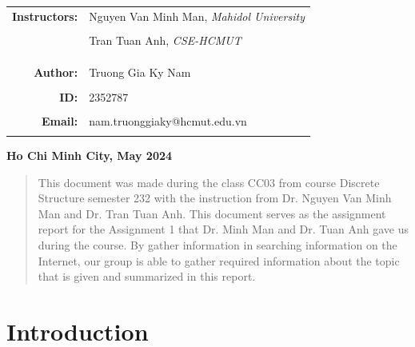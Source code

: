 \documentclass[a4paper]{article}
\begin{document}
\begin{titlepage}
\begin{center}
\begin{tabular}{ccc}
    \multicolumn{1}{r}{\textbf{\Large Instructors:}} & \multicolumn{2}{l}{\Large Nguyen Van Minh Man, \textit{Mahidol University}} \\ \\
    \multicolumn{1}{r}{} & \multicolumn{2}{l}{\Large Tran Tuan Anh, \textit{CSE-HCMUT}} \\ \\

    \\ \\

    \multicolumn{1}{r}{\Large \textbf{Author:}} & \multicolumn{2}{l}{\Large Truong Gia Ky Nam} \\ \\

    \multicolumn{1}{r}{\Large \textbf{ID:}} & \multicolumn{2}{l}{\Large 2352787} \\ \\

    \multicolumn{1}{r}{\Large \textbf{Email:}} & \multicolumn{2}{l}{\Large nam.truonggiaky@hcmut.edu.vn} \\ \\
\end{tabular}
\end{center}

\vspace{4cm}

\begin{center}
{\textbf{\Large Ho Chi Minh City, May 2024}}
\end{center}
\end{titlepage}

\thispagestyle{empty}
\setcounter{page}{-1}
\newpage
\tableofcontents
\newpage

\thispagestyle{empty}
\newpage
\begin{abstract}
\noindent This document was made during the class CC03 from course Discrete Structure semester 232 with the instruction from Dr. Nguyen Van Minh Man and Dr. Tran Tuan Anh. This document serves as the assignment report for the Assignment 1 that Dr. Minh Man and Dr. Tuan Anh gave us during the course. By gather information in searching information on the Internet, our group is able to gather required information about the topic that is given and summarized in this report.
\end{abstract}
\newpage

\section{Introduction}
\end{document}
